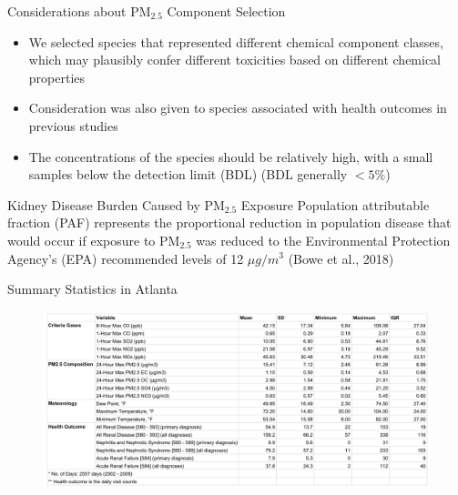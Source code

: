 \documentclass{beamer}
\begin{document}
\begin{frame}{Considerations about PM$_{2.5}$ Component Selection}
    \begin{itemize}
        \item We selected species that represented different chemical component classes, which may plausibly confer different toxicities based on different chemical properties
        \item Consideration was also given to species associated with health outcomes in previous studies
        \item The concentrations of the species should be relatively high, with a small samples below the detection limit (BDL) (BDL generally $<5\%$)
    \end{itemize}
\end{frame}

\begin{frame}{Kidney Disease Burden Caused by PM$_{2.5}$ Exposure}
    Population attributable fraction (PAF) represents the proportional reduction in population disease that would occur if exposure to PM$_{2.5}$ was reduced to the Environmental Protection Agency's (EPA) recommended levels of 12 $\mu g/m^3$ (Bowe et al., 2018)
\end{frame}

\begin{frame}{Summary Statistics in Atlanta}
    \begin{figure}[H]
        \centering
        \includegraphics[width=\textwidth]{img/appendix/Aim3/table.jpg}
    \end{figure}
\end{frame}
\end{document}
